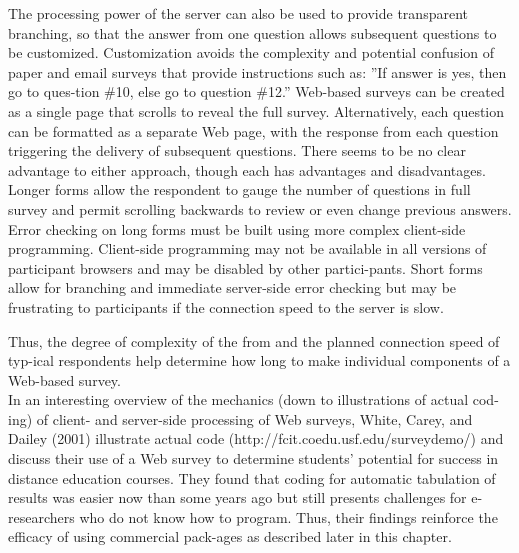 \documentclass[8pt]{beamer}
\begin{document}
\begin{frame}
\hspace*{0.5cm} The processing power of the server can also be used to provide transparent branching, so that the answer from one question allows subsequent questions to be customized. Customization avoids the complexity and potential confusion of paper and email surveys that provide instructions such as: ''If answer is yes, then go to ques-tion \#10, else go to question \#12.'' Web-based surveys can be created as a single page that scrolls to reveal the full survey. Alternatively, each question can be formatted as a separate Web page, with the response from each question triggering the delivery of subsequent questions. There seems to be no clear advantage to either approach, though each has advantages and disadvantages. Longer forms allow the respondent to gauge the number of questions in full survey and permit scrolling backwards to review or even change previous answers. Error checking on long forms must be built using more complex client-side programming. Client-side programming may not be available in all versions of participant browsers and may be disabled by other partici-pants. Short forms allow for branching and immediate server-side error checking but may be frustrating to participants if the connection speed to the server is slow.\\
\end{frame}

\begin{frame}
Thus, the degree of complexity of the from and the planned connection speed of typ-ical respondents help determine how long to make individual components of a Web-based survey.\\
\hspace*{0.5cm} In an interesting overview of the mechanics (down to illustrations of actual cod-ing) of client- and server-side processing of Web surveys, White, Carey, and Dailey (2001) illustrate actual code (http://fcit.coedu.usf.edu/surveydemo/) and discuss their use of a Web survey to determine students' potential for success in distance education courses. They found that coding for automatic tabulation of results was easier now than some years ago but still presents challenges for e-researchers who do not know how to program. Thus, their findings reinforce the efficacy of using commercial pack-ages as described later in this chapter.\\
\end{frame}
\end{document}
